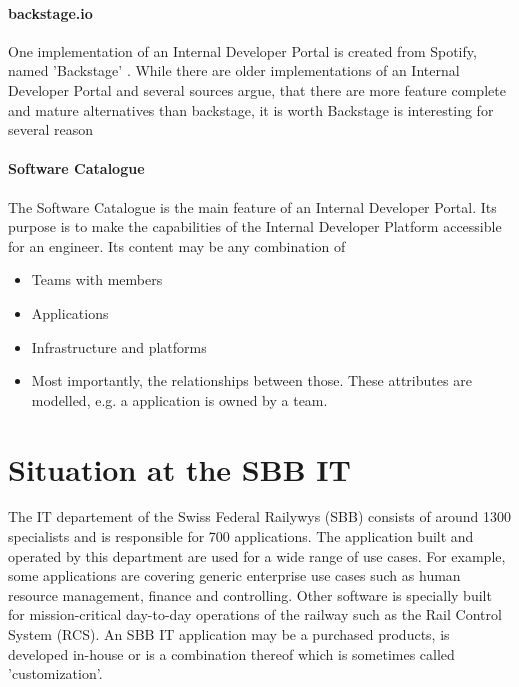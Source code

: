\documentclass[a4paper,12pt]{article}
\begin{document}
    \paragraph{backstage.io}
    One implementation of an Internal Developer Portal is created from Spotify, named 'Backstage' \parencite{backstageio}.
    While there are older implementations of an Internal Developer Portal and several sources argue, that there are more
    feature complete and mature alternatives than backstage, it is worth Backstage is interesting for several reason

    \paragraph{Software Catalogue}
    The Software Catalogue is the main feature of an Internal Developer Portal.
    Its purpose is to make the capabilities of the Internal Developer Platform accessible for an engineer.
    Its content may be any combination of
    \begin{itemize}
        \item Teams with members
        \item Applications
        \item Infrastructure and platforms
        \item Most importantly, the relationships between those. These attributes are modelled, e.g. a application is owned by a team.
    \end{itemize}


    \section{Situation at the SBB IT}
    The IT departement of the Swiss Federal Railywys (SBB) consists of around 1300 specialists and is responsible for
    700 applications\parencite{sbbitkennzahlen}.
    The application built and operated by this department are used for a wide range of use cases.
    For example, some applications are covering generic enterprise use cases such as human resource management, finance
    and controlling.
    Other software is specially built for mission-critical day-to-day operations of the railway such as the Rail Control
    System (RCS)\parencite{sbbrcs}.
    An SBB IT application may be a purchased products, is developed in-house or is a combination thereof which is sometimes called
    'customization'.
\end{document}
